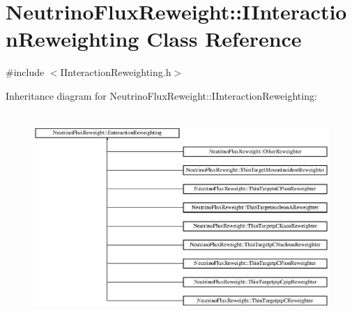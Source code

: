 \hypertarget{class_neutrino_flux_reweight_1_1_i_interaction_reweighting}{\section{Neutrino\-Flux\-Reweight\-:\-:I\-Interaction\-Reweighting Class Reference}
\label{class_neutrino_flux_reweight_1_1_i_interaction_reweighting}
}


{\ttfamily \#include $<$I\-Interaction\-Reweighting.\-h$>$}

Inheritance diagram for Neutrino\-Flux\-Reweight\-:\-:I\-Interaction\-Reweighting\-:\begin{figure}[H]
\begin{center}
\leavevmode
\includegraphics[height=7.909604cm]{class_neutrino_flux_reweight_1_1_i_interaction_reweighting}
\end{center}
\end{figure}
